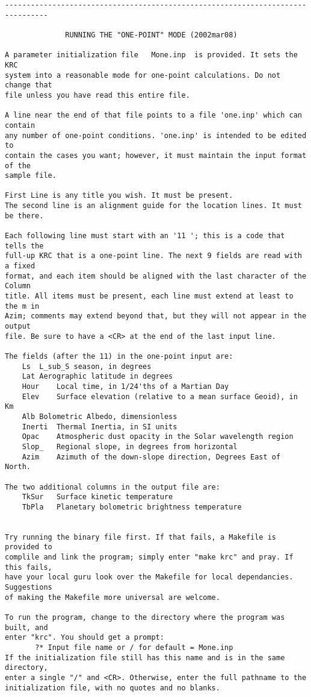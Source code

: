 \begin{verbatim}
--------------------------------------------------------------------------------

              RUNNING THE "ONE-POINT" MODE (2002mar08)

A parameter initialization file   Mone.inp  is provided. It sets the KRC 
system into a reasonable mode for one-point calculations. Do not change that 
file unless you have read this entire file.

A line near the end of that file points to a file 'one.inp' which can contain
any number of one-point conditions. 'one.inp' is intended to be edited to
contain the cases you want; however, it must maintain the input format of the
sample file.

First Line is any title you wish. It must be present.
The second line is an alignment guide for the location lines. It must be there.

Each following line must start with an '11 '; this is a code that tells the
full-up KRC that is a one-point line. The next 9 fields are read with a fixed
format, and each item should be aligned with the last character of the Column
title. All items must be present, each line must extend at least to the m in
Azim; comments may extend beyond that, but they will not appear in the output
file. Be sure to have a <CR> at the end of the last input line.

The fields (after the 11) in the one-point input are:
	Ls 	L_sub_S season, in degrees
	Lat	Aerographic latitude in degrees
	Hour	Local time, in 1/24'ths of a Martian Day
	Elev	Surface elevation (relative to a mean surface Geoid), in Km
	Alb	Bolometric Albedo, dimensionless
	Inerti	Thermal Inertia, in SI units
	Opac	Atmospheric dust opacity in the Solar wavelength region
	Slop_	Regional slope, in degrees from horizontal
	Azim	Azimuth of the down-slope direction, Degrees East of North.

The two additional columns in the output file are:
  	TkSur	Surface kinetic temperature
	TbPla	Planetary bolometric brightness temperature


Try running the binary file first. If that fails, a Makefile is provided to
complile and link the program; simply enter "make krc" and pray. If this fails,
have your local guru look over the Makefile for local dependancies. Suggestions
of making the Makefile more universal are welcome.

To run the program, change to the directory where the program was built, and
enter "krc". You should get a prompt:
       ?* Input file name or / for default = Mone.inp 
If the initialization file still has this name and is in the same directory,
enter a single "/" and <CR>. Otherwise, enter the full pathname to the 
initialization file, with no quotes and no blanks.


\end{verbatim}
